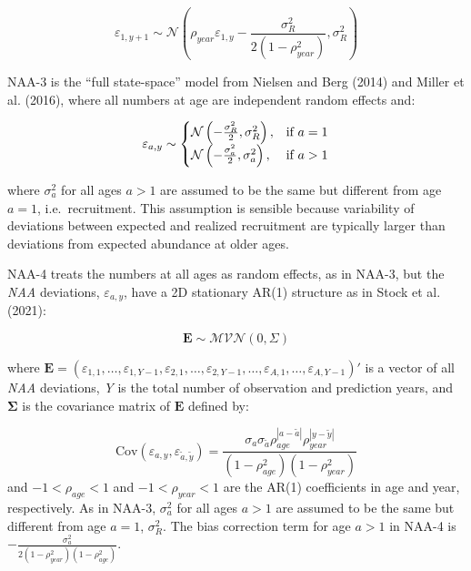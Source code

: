 \documentclass[]{article}
\begin{document}
\[\varepsilon_{1,y+1} \sim \mathcal{N}\left(\rho_{year} \varepsilon_{1,y} - \frac{\sigma^2_R}{2 (1-\rho^2_{year})}, \sigma^2_R \right)\]

NAA-3 is the ``full state-space'' model from Nielsen and Berg (2014) and
Miller et al. (2016), where all numbers at age are independent random
effects and:

\begin{equation}
  \varepsilon_{a,y} \sim \left\{
    \begin{array}{@{}ll@{}}
      \mathcal{N} \left( - \frac{\sigma^2_R}{2}, \sigma^2_R \right), & \text{if}\ a = 1 \\
      \mathcal{N} \left( - \frac{\sigma^2_a}{2}, \sigma^2_a \right), & \text{if}\ a > 1
    \end{array}\right.
\end{equation}

where \(\sigma^2_a\) for all ages \(a > 1\) are assumed to be the same
but different from age \(a = 1\), i.e.~recruitment. This assumption is
sensible because variability of deviations between expected and realized
recruitment are typically larger than deviations from expected abundance
at older ages.

NAA-4 treats the numbers at all ages as random effects, as in NAA-3, but
the \emph{NAA} deviations, \(\varepsilon_{a,y}\), have a 2D stationary
AR(1) structure as in Stock et al. (2021):

\[\mathbf{E} \sim \mathcal{MVN} \left( 0, \Sigma \right)\]

where
\(\mathbf{E} = (\varepsilon_{1,1}, \ldots, \varepsilon_{1,Y-1}, \varepsilon_{2,1}, \ldots, \varepsilon_{2,Y-1}, \ldots, \varepsilon_{A,1}, \ldots, \varepsilon_{A,Y-1})'\)
is a vector of all \emph{NAA} deviations, \emph{Y} is the total number
of observation and prediction years, and \(\boldsymbol{\Sigma}\) is the
covariance matrix of \(\mathbf{E}\) defined by:

\[ \text{Cov} \left( \varepsilon_{a,y}, \varepsilon_{\tilde{a},\tilde{y}} \right) = \frac{\sigma_a \sigma_{\tilde{a}} \rho^{|a-\tilde{a}|}_{age} \rho^{|y-\tilde{y}|}_{year}}{\left(1-\rho^2_{age}\right) \left(1-\rho^2_{year}\right)}\]
and \(-1<\rho_{age}<1\) and \(-1<\rho_{year}<1\) are the AR(1)
coefficients in age and year, respectively. As in NAA-3, \(\sigma^2_a\)
for all ages \(a > 1\) are assumed to be the same but different from age
\(a = 1\), \(\sigma^2_R\). The bias correction term for age \(a > 1\) in
NAA-4 is \(- \frac{\sigma^2_a}{2 (1-\rho^2_{year})(1-\rho^2_{age})}\).
\end{document}
